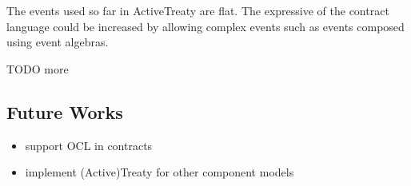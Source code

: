 \documentclass{llncs}
\begin{document}
The events used so far in ActiveTreaty are flat. The expressive of the contract language could be increased by allowing complex events such as events composed using event algebras. 

TODO more

\subsection{Future Works}

\begin{itemize}
	\item support OCL in contracts
	\item implement (Active)Treaty for other component models
\end{itemize}



  
    
\end{document}
